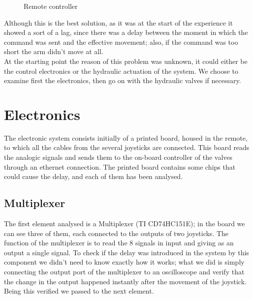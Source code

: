 \documentclass[12pt, a4paper]{article}
\begin{document}
\begin{figure}[ht]
\begin{minipage}[b]{0.45\linewidth}
		\caption{Remote controller}
		\label{fig:remote}
	\end{minipage}
\end{figure}

Although this is the best solution, as it was at the start of the experience it showed a sort of a lag, since there was a delay between the moment in which the command was sent and the effective movement; also, if the command was too short the arm didn’t move at all. 
\\
At the starting point the reason of this problem was unknown, it could either be the control electronics or the hydraulic actuation of the system. We choose to examine first the electronics, then go on with the hydraulic valves if necessary.
\\ 

\section{Electronics}
The electronic system consists initially of a printed board, housed in the remote, to which all the cables from the several joysticks are connected. This board reads the analogic signals and sends them to the on-board controller of the valves through an ethernet connection. The printed board contains some chips that could cause the delay, and each of them has been analysed.
\newpage\subsection{Multiplexer}
The first element analysed is a Multiplexer (TI CD74HC151E); in the board we can see three of them, each connected to the outputs of two joysticks. The function of the multiplexer is to read the 8 signals in input and giving as an output a single signal. To check if the delay was introduced in the system by this component we didn’t need to know exactly how it works; what we did is simply connecting the output port of the multiplexer to an oscilloscope and verify that the change in the output happened instantly after the movement of the joystick. Being this verified we passed to the next element.
\end{document}
